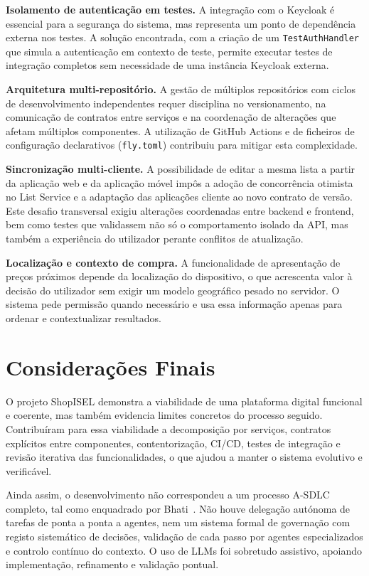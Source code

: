 \textbf{Isolamento de autenticação em testes.} A integração com o Keycloak é essencial para a segurança do sistema, mas representa um ponto de dependência externa nos testes. A solução encontrada, com a criação de um \texttt{TestAuthHandler} que simula a autenticação em contexto de teste, permite executar testes de integração completos sem necessidade de uma instância Keycloak externa.

\textbf{Arquitetura multi-repositório.} A gestão de múltiplos repositórios com ciclos de desenvolvimento independentes requer disciplina no versionamento, na comunicação de contratos entre serviços e na coordenação de alterações que afetam múltiplos componentes. A utilização de GitHub Actions e de ficheiros de configuração declarativos (\texttt{fly.toml}) contribuiu para mitigar esta complexidade.

\textbf{Sincronização multi-cliente.} A possibilidade de editar a mesma lista a partir da aplicação web e da aplicação móvel impôs a adoção de concorrência otimista no List Service e a adaptação das aplicações cliente ao novo contrato de versão. Este desafio transversal exigiu alterações coordenadas entre backend e frontend, bem como testes que validassem não só o comportamento isolado da API, mas também a experiência do utilizador perante conflitos de atualização.

\textbf{Localização e contexto de compra.} A funcionalidade de apresentação de preços próximos depende da localização do dispositivo, o que acrescenta valor à decisão do utilizador sem exigir um modelo geográfico pesado no servidor. O sistema pede permissão quando necessário e usa essa informação apenas para ordenar e contextualizar resultados.

\section{Considerações Finais}
\label{sec:8.3}

O projeto ShopISEL demonstra a viabilidade de uma plataforma digital funcional e coerente, mas também evidencia limites concretos do processo seguido. Contribuíram para essa viabilidade a decomposição por serviços, contratos explícitos entre componentes, contentorização, \ac{CI/CD}, testes de integração e revisão iterativa das funcionalidades, o que ajudou a manter o sistema evolutivo e verificável.

Ainda assim, o desenvolvimento não correspondeu a um processo A-SDLC completo, tal como enquadrado por Bhati~\cite{bhati-asdlc-2026}. Não houve delegação autónoma de tarefas de ponta a ponta a agentes, nem um sistema formal de governação com registo sistemático de decisões, validação de cada passo por agentes especializados e controlo contínuo do contexto. O uso de LLMs foi sobretudo assistivo, apoiando implementação, refinamento e validação pontual.

